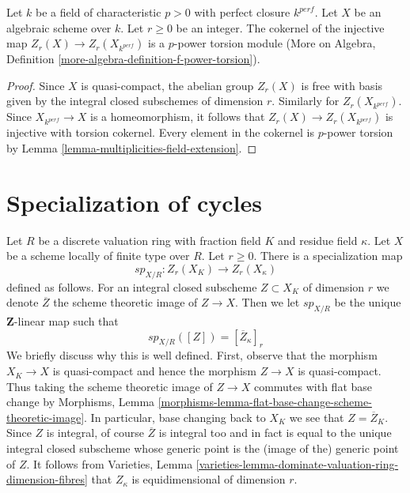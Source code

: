 \begin{lemma}
\label{lemma-how-different}
Let $k$ be a field of characteristic $p > 0$ with perfect closure $k^{perf}$.
Let $X$ be an algebraic scheme over $k$. Let $r \geq 0$ be an integer.
The cokernel of the injective map $Z_r(X) \to Z_r(X_{k^{perf}})$ is a
$p$-power torsion module (More on Algebra, Definition
\ref{more-algebra-definition-f-power-torsion}).
\end{lemma}

\begin{proof}
Since $X$ is quasi-compact, the abelian group $Z_r(X)$ is free with basis
given by the integral closed subschemes of dimension $r$. Similarly for
$Z_r(X_{k^{perf}})$.
Since $X_{k^{perf}} \to X$ is a homeomorphism, it follows
that $Z_r(X) \to Z_r(X_{k^{perf}})$ is injective with torsion cokernel.
Every element in the cokernel is $p$-power torsion by
Lemma \ref{lemma-multiplicities-field-extension}.
\end{proof}





\section{Specialization of cycles}
\label{section-specialization}

\noindent
Let $R$ be a discrete valuation ring with fraction field $K$
and residue field $\kappa$. Let $X$ be a scheme locally of finite type
over $R$. Let $r \geq 0$. There is a specialization map
$$
sp_{X/R} : Z_r(X_K) \longrightarrow Z_r(X_\kappa)
$$
defined as follows. For an integral closed subscheme $Z \subset X_K$
of dimension $r$ we denote $\overline{Z}$ the scheme theoretic image
of $Z \to X$. Then we let $sp_{X/R}$ be the unique $\mathbf{Z}$-linear
map such that
$$
sp_{X/R}([Z]) = [\overline{Z}_\kappa]_r
$$
We briefly discuss why this is well defined. First, observe that the
morphism $X_K \to X$ is quasi-compact and hence the morphism $Z \to X$
is quasi-compact. Thus taking the scheme theoretic image of $Z \to X$
commutes with flat base change by
Morphisms, Lemma \ref{morphisms-lemma-flat-base-change-scheme-theoretic-image}.
In particular, base changing back to $X_K$ we see that $Z = \overline{Z}_K$.
Since $Z$ is integral, of course $\overline{Z}$ is integral too and
in fact is equal to the unique integral closed subscheme whose generic
point is the (image of the) generic point of $Z$. It follows from
Varieties, Lemma \ref{varieties-lemma-dominate-valuation-ring-dimension-fibres}
that $Z_\kappa$ is equidimensional of dimension $r$.

